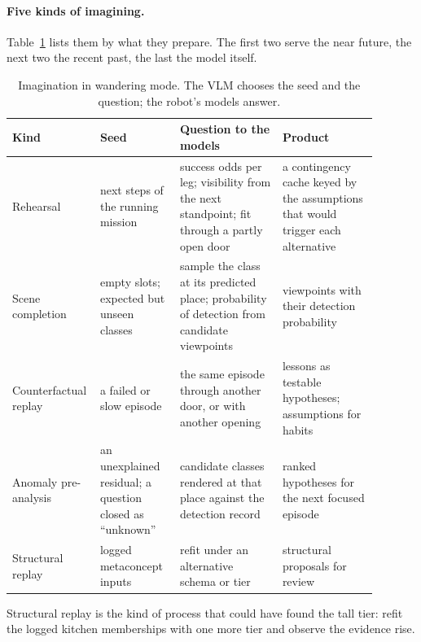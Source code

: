 \paragraph{Five kinds of imagining.}
Table~\ref{tab:lh_imagination} lists them by what they prepare. The first two serve the near future, the next two the
recent past, the last the model itself.

\begin{table}[ht]
    \centering
    \small
    \begin{tabular}{|>{\raggedright\arraybackslash}p{0.16\linewidth}|>{\raggedright\arraybackslash}p{0.21\linewidth}|>{\raggedright\arraybackslash}p{0.27\linewidth}|>{\raggedright\arraybackslash}p{0.25\linewidth}|}
        \hline
        \textbf{Kind} & \textbf{Seed} & \textbf{Question to the models} & \textbf{Product} \\ \hline
        Rehearsal & next steps of the running mission & success odds per leg; visibility from the next standpoint; fit through a partly open door & a contingency cache keyed by the assumptions that would trigger each alternative \\ \hline
        Scene completion & empty slots; expected but unseen classes & sample the class at its predicted place; probability of detection from candidate viewpoints & viewpoints with their detection probability \\ \hline
        Counterfactual replay & a failed or slow episode & the same episode through another door, or with another opening & lessons as testable hypotheses; assumptions for habits \\ \hline
        Anomaly pre-analysis & an unexplained residual; a question closed as ``unknown'' & candidate classes rendered at that place against the detection record & ranked hypotheses for the next focused episode \\ \hline
        Structural replay & logged metaconcept inputs & refit under an alternative schema or tier & structural proposals for review \\ \hline
    \end{tabular}
    \caption{Imagination in wandering mode. The VLM chooses the seed and the question; the robot's models answer.}
    \label{tab:lh_imagination}
\end{table}

Structural replay is the kind of process that could have found the tall tier: refit the logged kitchen memberships
with one more tier and observe the evidence rise.

